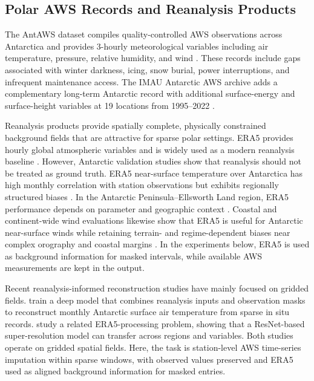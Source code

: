 \subsection{Polar AWS Records and Reanalysis Products}
The AntAWS dataset compiles quality-controlled AWS observations across Antarctica and provides 3-hourly meteorological variables including air temperature, pressure, relative humidity, and wind \citep{wang2023antaws}. These records include gaps associated with winter darkness, icing, snow burial, power interruptions, and infrequent maintenance access. The IMAU Antarctic AWS archive adds a complementary long-term Antarctic record with additional surface-energy and surface-height variables at 19 locations from 1995--2022 \citep{vantiggelen2025imau}.

Reanalysis products provide spatially complete, physically constrained background fields that are attractive for sparse polar settings. ERA5 provides hourly global atmospheric variables and is widely used as a modern reanalysis baseline \citep{hersbach2020era5}. However, Antarctic validation studies show that reanalysis should not be treated as ground truth. ERA5 near-surface temperature over Antarctica has high monthly correlation with station observations but exhibits regionally structured biases \citep{zhu2021era5antarctica}. In the Antarctic Peninsula--Ellsworth Land region, ERA5 performance depends on parameter and geographic context \citep{tetzner2019era5antarcticpeninsula}. Coastal and continent-wide wind evaluations likewise show that ERA5 is useful for Antarctic near-surface winds while retaining terrain- and regime-dependent biases near complex orography and coastal margins \citep{catonharrison2022antarcticwinds,rakoczy2026era5winds}. In the experiments below, ERA5 is used as background information for masked intervals, while available AWS measurements are kept in the output.

Recent reanalysis-informed reconstruction studies have mainly focused on gridded fields. \citet{ma2025antarcticsat} train a deep model that combines reanalysis inputs and observation masks to reconstruct monthly Antarctic surface air temperature from sparse in situ records. \citet{li2026era5superresolution} study a related ERA5-processing problem, showing that a ResNet-based super-resolution model can transfer across regions and variables. Both studies operate on gridded spatial fields. Here, the task is station-level AWS time-series imputation within sparse windows, with observed values preserved and ERA5 used as aligned background information for masked entries.

